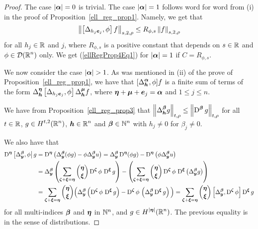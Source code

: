 \begin{proof}
The case $|{\bm{\alpha}}|=0$ is trivial.
The case $|{\bm{\alpha}}|=1$ follows word for word from (i) in the proof of
Proposition~\ref{ell_reg_prop1}.  Namely, we get that
\[
\left\| \left[ \Delta_{h_j{\bm{e}}_j} ,\phi \right] f \right\|_{s,2,\rho}
\leq R_{\phi,s} \left\| f \right\|_{s,2,\rho}
\]
for all $h_j \in \mathbb{R}$ and $j$, where $R_{\phi,s}$ is a positive constant that
depends on $s\in \mathbb{R}$ and $\displaystyle \phi \in \mathcal{D}(\mathbb{R}^n)$ only.  We get
(\ref{ellRegProp4Eq1}) for $|{\bm{\alpha}}|=1$ if $C=R_{\phi,s}$.

We now consider the case $|\VEC{\alpha}|>1$.  As was mentioned
in (ii) of the prove of Proposition~\ref{ell_reg_prop1}, we have that
$\displaystyle [\Delta^{{\bm{\alpha}}}_{{\bm{h}}}, \phi] f$
is a finite sum of terms of the form
$\displaystyle \Delta^{{\bm{\eta}}}_{{\bm{h}}} \left[
\Delta_{h_j {\bm{e}}_j}, \phi\right] \Delta^{{\bm{\mu}}}_{{\bm{h}}} f$,
where ${\bm{\eta}}+{\bm{\mu}}+{\bm{e}}_j = {\bm{\alpha}}$ and $1\leq j \leq n$.

We have from Proposition~\ref{ell_reg_prop3} that
$\displaystyle \left\| \Delta^{{\bm{\beta}}}_{{\bm{h}}} g \right\|_{t,\rho}
\leq \left\| \operatorname{D}^{{\bm{\beta}}} g \right\|_{t,\rho}$
for all $t\in \mathbb{R}$, $\displaystyle g \in H^{t,2}(\mathbb{R}^n)$,
$\displaystyle {\bm{h}} \in \mathbb{R}^n$ and $\displaystyle {\bm{\beta}} \in \mathbb{N}^n$
with $h_j \neq 0$ for $\beta_j \neq 0$.

We also have that
\begin{align*}
\operatorname{D}^{{\bm{\eta}}}\left[ \Delta^{{\bm{\beta}}}_{{\bm{y}}}, \phi\right| g
&= \operatorname{D}^{{\bm{\eta}}} \left( \Delta^{{\bm{\beta}}}_{{\bm{y}}} (\phi g) - \phi
\Delta^{{\bm{\beta}}}_{{\bm{y}}} u \right)
= \Delta^{{\bm{\beta}}}_{{\bm{y}}} \operatorname{D}^{{\bm{\eta}}}(\phi g)
- \operatorname{D}^{{\bm{\eta}}} \left(\phi
\Delta^{{\bm{\beta}}}_{{\bm{y}}} u \right) \\
&= \Delta^{{\bm{\beta}}}_{{\bm{y}}} \left(\sum_{{\bm{\zeta}}+{\bm{\xi}} = {\bm{\eta}}}
\binom{{\bm{\eta}}}{{\bm{\xi}}}
\operatorname{D}^{{\bm{\zeta}}} \phi \, \operatorname{D}^{{\bm{\xi}}} g \right)
- \left(\sum_{{\bm{\zeta}}+{\bm{\xi}} = {\bm{\eta}}}
\binom{{\bm{\eta}}}{{\bm{\xi}}} \operatorname{D}^{{\bm{\zeta}}} \phi \,
\operatorname{D}^{{\bm{\xi}}} \left( \Delta^{{\bm{\beta}}}_{{\bm{y}}} g \right) \right) \\
&= \sum_{{\bm{\zeta}}+{\bm{\xi}} = {\bm{\eta}}} \binom{{\bm{\eta}}}{{\bm{\xi}}} \Big(
\Delta^{{\bm{\beta}}}_{{\bm{y}}} \left( \operatorname{D}^{{\bm{\zeta}}} \phi \,
\operatorname{D}^{{\bm{\xi}}} g \right)
- \operatorname{D}^{{\bm{\zeta}}} \phi \, \left( \Delta^{{\bm{\beta}}}_{{\bm{y}}}
\operatorname{D}^{{\bm{\xi}}} g \right) \Big)
= \sum_{{\bm{\zeta}}+{\bm{\xi}} = {\bm{\eta}}} \binom{{\bm{\eta}}}{{\bm{\xi}}}
\left[ \Delta^{{\bm{\beta}}}_{{\bm{y}}} , \operatorname{D}^{{\bm{\zeta}}} \phi \right]
\operatorname{D}^{{\bm{\xi}}} g
\end{align*}
for all multi-indices ${\bm{\beta}}$ and ${\bm{\eta}}$ in $\mathbb{N}^n$,
and $\displaystyle g \in H^{|{\bm{\eta}}|}(\mathbb{R}^n)$. The previous
equality is in the sense of distributions.


\end{proof}

